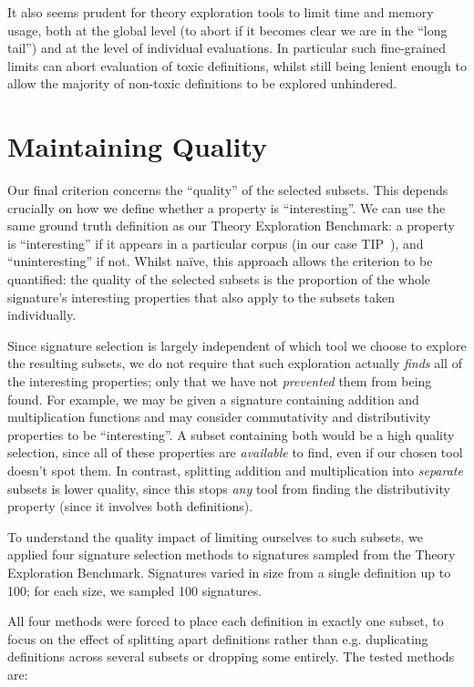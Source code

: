 It also seems prudent for theory exploration tools to limit time and memory
usage, both at the global level (to abort if it becomes clear we are in the
``long tail'') and at the level of individual evaluations. In particular such
fine-grained limits can abort evaluation of toxic definitions, whilst still
being lenient enough to allow the majority of non-toxic definitions to be
explored unhindered.

\section{Maintaining Quality}

Our final criterion \iffalse TODO: Alison: This looks odd since you haven't
mentioned criteria before \fi concerns the ``quality'' of the selected
subsets. This depends crucially on how we define whether a property is
``interesting''. We can use the same ground truth definition as our Theory
Exploration Benchmark: a property is ``interesting'' if it appears in a
particular corpus (in our case TIP~\cite{claessen2015tip}), and
``uninteresting'' if not. Whilst na\"ive, this approach allows the criterion to
be quantified: the quality of the selected subsets is the proportion of the
whole signature's interesting properties that also apply to the subsets taken
individually.

Since signature selection is largely independent of which tool we choose to
explore the resulting subsets, we do not require that such exploration actually
\emph{finds} all of the interesting properties; only that we have not
\emph{prevented} them from being found. For example, we may be given a signature
containing addition and multiplication functions and may consider commutativity
and distributivity properties to be ``interesting''. A subset containing both
would be a high quality selection, since all of these properties are
\emph{available} to find, even if our chosen tool doesn't spot them. In
contrast, splitting addition and multiplication into \emph{separate} subsets is
lower quality, since this stops \emph{any} tool from finding the distributivity
property (since it involves both definitions).

To understand the quality impact of limiting ourselves to such subsets, we
applied four signature selection methods to signatures sampled from the Theory
Exploration Benchmark. Signatures varied in size from a single definition up to
100; for each size, we sampled 100 signatures.

All four methods were forced to place each definition in exactly one subset, to
focus on the effect of splitting apart definitions rather than e.g. duplicating
definitions across several subsets or dropping some entirely. The tested methods
are:

